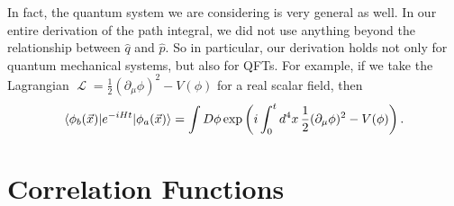 \documentclass{report}
\theoremstyle{plain}
\theoremstyle{definition}
\theoremstyle{remark}
\DeclareMathOperator{\cL}{\mathcal{L}}
\begin{document}
In fact, the quantum system we are considering is very general as
well. In our entire derivation of the path integral, we did not use
anything beyond the relationship between $\hat{q}$ and $\hat{p}$. So
in particular, our derivation holds not only for quantum mechanical
systems, but also for QFTs. For example, if we take the Lagrangian
$\cL = \frac{1}{2} (\partial_\mu \phi)^2 - V(\phi)$ for a real scalar
field, then
$$ \braket{\phi_b(\vec{x}) | e^{-iHt} | \phi_a(\vec{x})} = \int D\phi \exp\left(i \int_0^t d^4x \, \frac{1}{2} (\partial_\mu \phi)^2 - V(\phi)\right). $$

\section{Correlation Functions}
\end{document}
